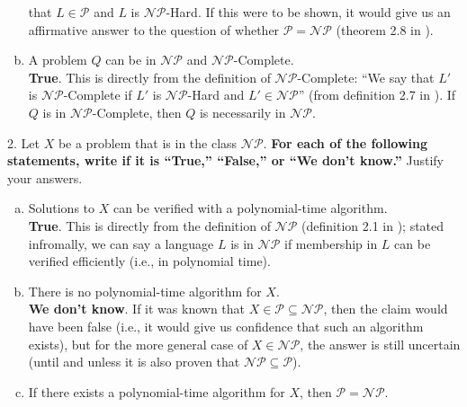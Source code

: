 \documentclass{scrartcl}
\begin{document}
\begin{flushleft}
\begin{enumerate}[(a)]
            that $L \in \mathcal{P}$ and $L$ is $\mathcal{NP}$-Hard. If this were to be shown, it
            would give us an affirmative answer to the question of whether $\mathcal{P} =
            \mathcal{NP}$ (theorem 2.8 in \cite{modernapp}).
        \item A problem $Q$ can be in $\mathcal{NP}$ and $\mathcal{NP}$-Complete.\\
            \bigskip
            \textbf{True}. This is directly from the definition of $\mathcal{NP}$-Complete: ``We say
            that $L'$ is $\mathcal{NP}$-Complete if $L'$ is $\mathcal{NP}$-Hard and $L' \in
            \mathcal{NP}$'' (from definition 2.7 in \cite{modernapp}). If $Q$ is in
            $\mathcal{NP}$-Complete, then $Q$ is necessarily in $\mathcal{NP}$.
    \end{enumerate}
    2. Let $X$ be a problem that is in the class $\mathcal{NP}$. \textbf{For each of the following
    statements, write if it is ``True,'' ``False,'' or ``We don't know.''} Justify your answers.\\
    \begin{enumerate}[(a)]
        \item Solutions to $X$ can be verified with a polynomial-time algorithm.\\
            \bigskip
            \textbf{True}. This is directly from the definition of $\mathcal{NP}$ (definition 2.1 in
            \cite{modernapp}); stated infromally, we can say a language $L$ is in $\mathcal{NP}$ if
            membership in $L$ can be verified efficiently (i.e., in polynomial time).
        \item There is no polynomial-time algorithm for $X$.\\
            \bigskip
            \textbf{We don't know}. If it was known that $X \in \mathcal{P} \subseteq \mathcal{NP}$,
            then the claim would have been false (i.e., it would give us confidence that such an
            algorithm exists), but for the more general case of $X \in \mathcal{NP}$, the answer is
            still uncertain (until and unless it is also proven that $\mathcal{NP} \subseteq
            \mathcal{P}$).
        \item If there exists a polynomial-time algorithm for $X$, then $\mathcal{P} =
            \mathcal{NP}$.\\

\end{enumerate}
\end{flushleft}
\end{document}
